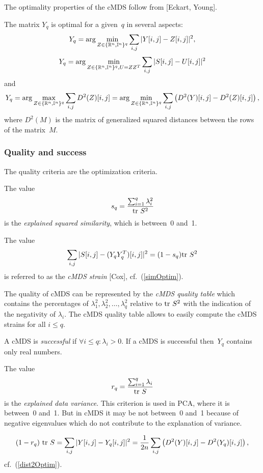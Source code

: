 \documentclass[10pt,a4paper]{article}
\begin{document}
The optimality properties of the cMDS follow from [Eckart, Young].

The matrix $Y_q$ is optimal for a given~$q$ in several aspects:
$$ Y_q = \arg \min_{Z \in \{\mathbb R^n,\mathbb I^n\}^q} \sum_{i,j} |Y [i,j]-Z[i,j]|^2, $$
\begin{equation} \label{simOptim}
 Y_q = \arg \min_{Z\in \{\mathbb R^n,\mathbb I^n\}^q,U=ZZ^T} \sum_{i,j} |S[i,j]-U[i,j]|^2
\end{equation}
and
\begin{equation} \label{dist2Optim}
Y_q = \arg \max_{Z\in \{\mathbb R^n,\mathbb I^n\}^q} \sum_{i,j} D^2(Z)[i,j] =
  \arg \min_{Z \in \{\mathbb R^n,\mathbb I^n\}^q} \sum_{i,j} \left(D^2(Y)[i,j] - D^2(Z)[i,j] \right),
\end{equation}
where $D^2(M)$ is the matrix of generalized squared distances between the rows of the matrix~$M$.


\subsubsection {Quality and success}

The quality criteria are the optimization criteria.

The value
$$ s_q = \frac { \sum_{i=1}^q \lambda_i^2} {\mathrm {tr} \  S^2} $$
is the {\em explained squared similarity}, which is between~0 and~1.

The value
$$ \sum_{i,j} |S[i,j]-(Y_q Y_q^T)[i,j]|^2 = (1 - s_q) \mathrm {tr} \  S^2 $$
is referred to as the {\em cMDS strain} [Cox],
cf.~(\ref{simOptim}).

The quality of cMDS can be represented by the {\em cMDS quality table} which contains the percentages of $\lambda_1^2, \lambda_2^2, \dots, \lambda_q^2$ relative to $\mathrm {tr} \  S^2$ with the indication of the negativity of $\lambda_i$.
The cMDS quality table allows to easily compute the cMDS strains for all $i \le q$.

A cMDS is {\em successful} if $\forall i \le q : \lambda_i > 0$.
If a cMDS is successful then~$Y_q$ contains only real numbers.

The value
$$ r_q = \frac {\sum_{i=1}^q \lambda_i} {\mathrm {tr} \  S} $$
is the {\em explained data variance}.
This criterion is used in PCA, where it is between~0 and~1.
But in cMDS it may be not between~0 and~1 because of negative eigenvalues which do not contribute to the explanation of variance.

$$ (1 - r_q) \ \mathrm {tr} \  S = \sum_{i,j} |Y [i,j]-Y_q [i,j]|^2 = \frac 1 {2n} \sum_{i,j} \left(D^2(Y)[i,j] - D^2(Y_q)[i,j] \right), $$
cf.~(\ref{dist2Optim}).
\comm{}
\end{document}
